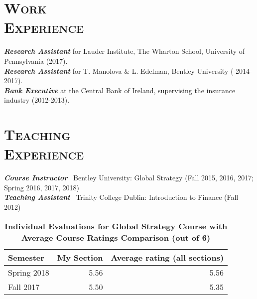 \documentclass[margin, 12pt]{res}
\begin{document}
\begin{resume}
\begin{itemize}
\end{itemize}



\section{\normalfont\textsc{Work \\Experience}}
\textbf{\textit{Research Assistant}} for Lauder Institute, The Wharton School, University of Pennsylvania (2017). \\
\textbf{\textit{Research Assistant}} for T. Manolova \& L. Edelman, Bentley University ( 2014-2017). \\
\textbf{\textit{Bank Executive}} at the Central Bank of Ireland, supervising the insurance industry (2012-2013). 


\section{\normalfont\textsc{Teaching \\Experience}}
\textbf{\textit{Course Instructor}}~ Bentley University:
Global Strategy (Fall 2015, 2016, 2017; Spring 2016, 2017, 2018) \\
\textbf{\textit{Teaching Assistant}}~ Trinity College Dublin:
Introduction to Finance (Fall 2012)
 
%
 
\begin{table}[htbp]
  \centering
  \caption{\textbf{Individual Evaluations for Global Strategy Course	with Average Course Ratings Comparison (out of 6)}}
    \begin{tabular}{lrr}
    \midrule
    Semester & My Section & Average rating (all sections) \\
    \midrule
    Spring 2018 & 5.56  & 5.56 \\
    Fall 2017 & 5.50  & 5.35 \\


\end{tabular}
\end{table}
\end{resume}
\end{document}
